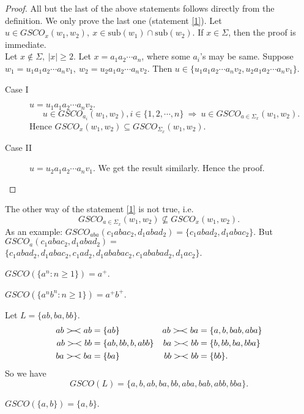 \documentclass{llncs}
\newcommand{\sg}{\Sigma}
\newcommand{\sub}{\mathrm{sub}}
\newcommand{\ers}{>\hspace{-2mm}-\hspace{-2mm}<}
\begin{document}
\begin{proof}
All but the last of the above statements follows directly from the
definition. We only prove the last one (statement \ref{1}).
Let $u\in GSCO_x(w_1,w_2),~x\in\sub(w_1)\cap\sub(w_2)$. If $x\in\sg$,
then the proof is immediate.\\
Let $x\notin\sg,~|x|\geq2$. Let $x=a_1a_2\cdots a_n$, where some
$a_i$'s
 may be same. Suppose $w_1=u_1 a_1a_2\cdots a_nv_1, ~w_2=u_2 a_1a_2\cdots a_nv_2$.
 Then $u\in\{u_1 a_1a_2\cdots a_nv_2,u_2 a_1a_2\cdots a_nv_1\}$.
\begin{description}
\item[Case I] $u=u_1 a_1a_2\cdots a_nv_2.$
\[u\in GSCO_{a_i}(w_1,w_2),i\in\{1,2,\cdots,n\}~\Rightarrow ~u\in
GSCO_{a\in\sg_x}(w_1,w_2).\]
 Hence $GSCO_x(w_1,w_2)\subseteq
GSCO_{\sg_x}(w_1,w_2)$.
\item[Case II]  $u=u_2a_1a_2\cdots a_nv_1$. We get the result similarly. Hence the proof.
\end{description}
\end{proof}
\begin{note}
The other way of the statement \ref{1} is not true, i.e.
\[ GSCO_{a\in\sg_x}(w_1,w_2)\not\subseteq GSCO_{x}(w_1,w_2).\]
As an example: $GSCO_{aba}(c_1abac_2,d_1abad_2)=\{c_1abad_2,d_1abac_2\}$.
 But $GSCO_a(c_1abac_2,d_1abad_2)=$ \\
$\{c_1abad_2,d_1abac_2,c_1ad_2,d_1ababac_2,c_1ababad_2,d_1ac_2\}$.
\end{note}

\begin{example}
$GSCO(\{a^n:n\geq1\})=a^+$.
\end{example}

\begin{example}
$GSCO(\{a^nb^n:n\geq1\})=a^+b^+$.
\end{example}


\begin{example}
Let $L=\{ab,ba,bb\}$.
\begin{align*}
ab \ers ab &=\{ab\} &ab\ers ba &=\{a,b,bab,aba\}\\
ab\ers bb &=\{ab,bb,b,abb\} &ba\ers bb &=\{b,bb,ba,bba\}\\
ba\ers ba &=\{ba\} &bb\ers bb &=\{bb\}.
\end{align*}
So we have
\[GSCO(L)=\{a,b,ab,ba,bb,aba,bab,abb,bba\}.\]
\end{example}

\begin{example}
$GSCO(\{a,b\})=\{a,b\}$.
\end{example}
\end{document}

